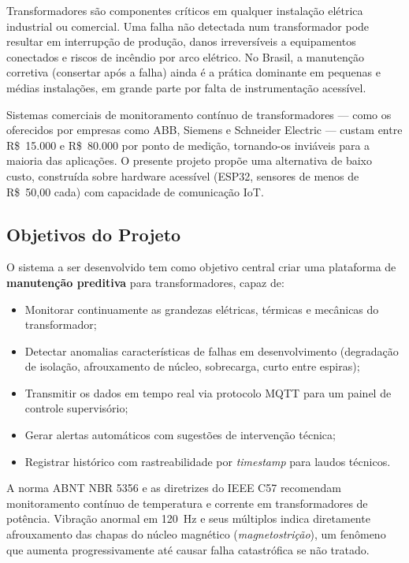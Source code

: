 \documentclass[12pt, a4paper]{article}
\begin{document}
Transformadores são componentes críticos em qualquer instalação elétrica industrial ou comercial. Uma falha não detectada num transformador pode resultar em interrupção de produção, danos irreversíveis a equipamentos conectados e riscos de incêndio por arco elétrico. No Brasil, a manutenção corretiva (consertar após a falha) ainda é a prática dominante em pequenas e médias instalações, em grande parte por falta de instrumentação acessível.

Sistemas comerciais de monitoramento contínuo de transformadores --- como os oferecidos por empresas como ABB, Siemens e Schneider Electric --- custam entre R\$~15.000 e R\$~80.000 por ponto de medição, tornando-os inviáveis para a maioria das aplicações. O presente projeto propõe uma alternativa de baixo custo, construída sobre hardware acessível (ESP32, sensores de menos de R\$~50,00 cada) com capacidade de comunicação IoT.

\subsection{Objetivos do Projeto}

O sistema a ser desenvolvido tem como objetivo central criar uma plataforma de \textbf{manutenção preditiva} para transformadores, capaz de:

\begin{itemize}[leftmargin=2cm]
    \item Monitorar continuamente as grandezas elétricas, térmicas e mecânicas do transformador;
    \item Detectar anomalias características de falhas em desenvolvimento (degradação de isolação, afrouxamento de núcleo, sobrecarga, curto entre espiras);
    \item Transmitir os dados em tempo real via protocolo MQTT para um painel de controle supervisório;
    \item Gerar alertas automáticos com sugestões de intervenção técnica;
    \item Registrar histórico com rastreabilidade por \emph{timestamp} para laudos técnicos.
\end{itemize}

\begin{tcolorbox}[caixaInfo, title={Por que isso importa?}]
A norma ABNT NBR 5356 e as diretrizes do IEEE C57 recomendam monitoramento contínuo de temperatura e corrente em transformadores de potência. Vibração anormal em 120~Hz e seus múltiplos indica diretamente afrouxamento das chapas do núcleo magnético (\emph{magnetostrição}), um fenômeno que aumenta progressivamente até causar falha catastrófica se não tratado.
\end{tcolorbox}
\end{document}
